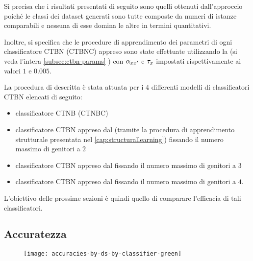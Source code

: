 Si precisa che i risultati presentati di seguito sono quelli ottenuti dall'approccio \emph{} poiché le classi dei dataset generati sono tutte composte da numeri di istanze comparabili e nessuna di esse domina le altre in termini quantitativi.

Inoltre, si specifica che le procedure di apprendimento dei parametri di ogni classificatore \acs{CTBN} (\acs{CTBNC}) appreso sono state effettuate utilizzando la \emph{} (si veda l'intera \autoref{subsec:ctbn-params} ) con  $\alpha_{\mathnormal{x}\mathnormal{x}^{\prime}}$ e $\tau_{\mathnormal{x}}$ impostati rispettivamente ai valori $1$ e $0.005$.

La procedura di  descritta è stata attuata per i $4$ differenti modelli di classificatori \acs{CTBN} elencati di seguito:
\begin{itemize}
	\item classificatore \acs{CTNB} (\acs{CTNBC})
	\item classificatore \acs{CTBN} appreso dal \emph{} (tramite la procedura di apprendimento strutturale presentata nel \vref{cap:structurallearning}) fissando il numero massimo di genitori a $2$
	\item classificatore \acs{CTBN} appreso dal \emph{} fissando il numero massimo di genitori a $3$
	\item classificatore \acs{CTBN} appreso dal \emph{} fissando il numero massimo di genitori a $4$.
\end{itemize}
L'obiettivo delle prossime sezioni è quindi quello di comparare l'efficacia di tali classificatori.

\subsection{Accuratezza}

\begin{figure}
	\centering
	\texttt{[image: accuracies-by-ds-by-classifier-green]}
\end{figure}


